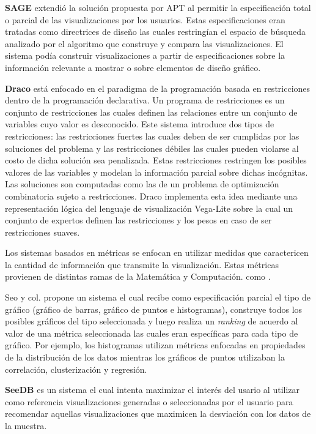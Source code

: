\textbf{SAGE} \cite{roth1994interactive} extendi\'o la soluci\'on propuesta por APT al permitir
la especificaci\'on total o parcial de las visualizaciones por los usuarios. Estas especificaciones
eran tratadas como directrices de dise\~no las cuales restring\'ian el espacio de b\'usqueda
analizado por el algoritmo que construye y compara las visualizaciones. El sistema pod\'ia construir
visualizaciones a partir de especificaciones sobre la informaci\'on relevante a mostrar o sobre
elementos de dise\~no gr\'afico.


\textbf{Draco} \cite{saket2018beyond} est\'a enfocado en el paradigma de la programaci\'on
basada en restricciones dentro de la programaci\'on declarativa. Un programa de restricciones 
es un conjunto de restricciones las cuales definen las relaciones entre un conjunto de variables cuyo
valor es desconocido. Este sistema introduce dos tipos de restricciones: las restricciones fuertes
las cuales deben de ser cumplidas por las soluciones del problema y las restricciones d\'ebiles las cuales
pueden violarse al costo de dicha soluci\'on sea penalizada. Estas restricciones restringen los posibles
valores de las variables y modelan la informaci\'on parcial sobre dichas inc\'ognitas. Las soluciones son
computadas como las de un problema de optimizaci\'on combinatoria sujeto a restricciones. Draco implementa
esta idea mediante una representaci\'on l\'ogica del lenguaje de visualizaci\'on Vega-Lite sobre la
cual un conjunto de expertos definen las restricciones y los pesos en caso de ser restricciones suaves.

Los sistemas basados en m\'etricas se enfocan en utilizar medidas que caractericen la cantidad
de informaci\'on que transmite la visualizaci\'on. Estas m\'etricas provienen de distintas ramas
de la Matem\'atica y Computaci\'on. como .

Seo y col. \cite{seo2004rank} propone un sistema el cual recibe como especificaci\'on parcial el tipo de
gr\'afico (gr\'afico de barras, gr\'afico de puntos e histogramas), construye todos los posibles
gr\'aficos del tipo seleccionada y luego realiza un \textit{ranking} de acuerdo al valor de una m\'etrica seleccionada las
cuales eran espec\'ificas para cada tipo de gr\'afico. Por ejemplo, los histogramas utilizan m\'etricas enfocadas en propiedades
de la distribuci\'on de los datos mientras los gr\'aficos de puntos utilizaban la correlaci\'on, clusterizaci\'on y regresi\'on.

\textbf{SeeDB} \cite{vartak2014seedb} es un sistema el cual intenta maximizar el inter\'es del usario
al utilizar como referencia visualizaciones generadas o seleccionadas por el usuario
para recomendar aquellas visualizaciones que maximicen la desviaci\'on con los datos de la muestra.


